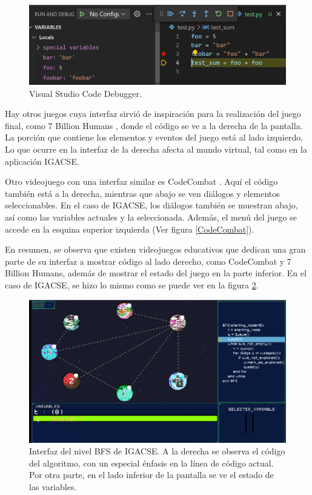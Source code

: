 \begin{figure}[h]
	\centering
	\includegraphics[scale=0.5]{imagenes/VScodeDebugger.png}
	\caption{Visual Studio Code Debugger.}
	\label{VScodeDebugger}
\end{figure}

Hay otros juegos cuya interfaz sirvió de inspiración para la realización del juego final, como 7 Billion Humans \cite{7billionhumans}, donde el código se ve a la derecha de la pantalla. La porción que contiene los elementos y eventos del juego está al lado izquierdo. Lo que ocurre en la interfaz de la derecha afecta al mundo virtual, tal como en la aplicación IGACSE.

Otro videojuego con una interfaz similar es CodeCombat \cite{CodeCombat}. Aquí el código también está a la derecha, mientras que abajo se ven diálogos y elementos seleccionables. En el caso de IGACSE, los diálogos también se muestran abajo, así como las variables actuales y la seleccionada. Además, el menú del juego se accede en la esquina superior izquierda (Ver figura \ref{CodeCombat}).

En resumen, se observa que existen videojuegos educativos que dedican una gran parte de su interfaz a mostrar código al lado derecho, como CodeCombat y 7 Billion Humans, además de mostrar el estado del juego en la parte inferior. En el caso de IGACSE, se hizo lo mismo como se puede ver en la figura \ref{InterfazBFS}.

\begin{figure}[h]
	\centering
	\includegraphics[scale=0.5]{imagenes/InterfazBFS.png}
	\caption{Interfaz del nivel BFS de IGACSE. A la derecha se observa el código del algoritmo, con un especial énfasis en la línea de código actual. Por otra parte, en el lado inferior de la pantalla se ve el estado de las variables.}
	\label{InterfazBFS}
\end{figure}


